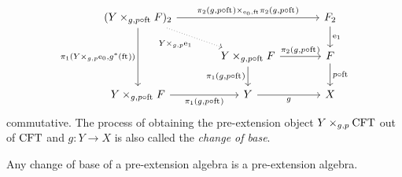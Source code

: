 \begin{defn}
\begin{equation*}
\begin{tikzcd}[column sep=large]
(\cobesys{Y}{\stesysf}{g}{p\circ\eft})_2
  \ar{rr}{\pullback{\pullbackpr{2}{g}{p\circ\eft}}{\pullbackpr{2}{g}{p\circ\eft}}{\ectxext}{\eft}}
  \ar{dd}[swap]{\pullbackpr{1}{\cobesys{Y}{\ectxext}{g}{p}}{g^\ast(\eft)}}
  \ar[dotted]{dr}[swap]{\cobesys{Y}{\efamext}{g}{p}}
  &
  &
\stesysf_2
  \ar{d}{\efamext}
  \\
  {}&
\cobesys{Y}{\stesysf}{g}{p\circ\eft}
  \ar{r}{\pullbackpr{2}{g}{p\circ\eft}}
  \ar{d}[swap]{\pullbackpr{1}{g}{p\circ\eft}}
  &
\stesysf
  \ar{d}{p\circ\eft}
  \\
\cobesys{Y}{\stesysf}{g}{p\circ\eft}
  \ar{r}[swap]{\pullbackpr{1}{g}{p\circ\eft}}
  &
Y \ar{r}[swap]{g}
  &
X
\end{tikzcd}
\end{equation*} 
commutative. 
The process of obtaining the pre-extension object $\cobesys{Y}{\stesys}{g}{p}$ out of $\mathrm{CFT}$
and $g:Y\to X$ is also called the \emph{change of base}.
\end{defn}

\begin{lem}
Any change of base of a pre-extension algebra is a pre-extension algebra.
\end{lem}

